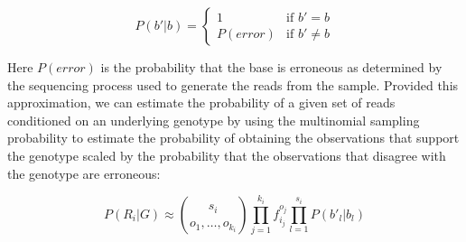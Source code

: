 \documentclass{article}
\begin{document}
\begin{equation}
P(b'|b) = 
\left\{
	\begin{array}{ll}
		1 & \mbox{if } b' = b \\
		P(error) & \mbox{if } b' \neq b
	\end{array}
\right.
\end{equation}

Here $P(error)$ is the probability that the base is erroneous as determined by the sequencing process used to generate the reads from the sample.  Provided this approximation, we can estimate the probability of a given set of reads conditioned on an underlying genotype by using the multinomial sampling probability to estimate the probability of obtaining the observations that support the genotype scaled by the probability that the observations that disagree with the genotype are erroneous:

\begin{equation}
P(R_i|G) \approx {s_i \choose o_1,\ldots,o_{k_i} } 
\prod_{j=1}^{k_i} { f_{i_j}^{o_j} }
\prod_{l=1}^{s_i} { P(b'_l | b_l) }
\end{equation}

\end{document}
